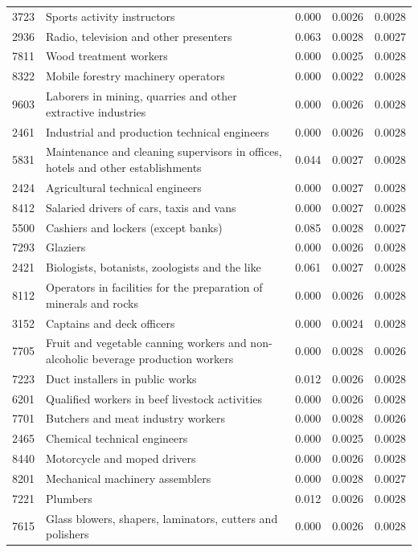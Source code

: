 \begin{longtable}{p{}>{\raggedright\arraybackslash}p{}rrr}
3723 & Sports activity instructors & 0.000 & 0.0026 & 0.0028 \\
2936 & Radio, television and other presenters & 0.063 & 0.0028 & 0.0027 \\
7811 & Wood treatment workers & 0.000 & 0.0025 & 0.0028 \\
8322 & Mobile forestry machinery operators & 0.000 & 0.0022 & 0.0028 \\
9603 & Laborers in mining, quarries and other extractive industries & 0.000 & 0.0026 & 0.0028 \\
2461 & Industrial and production technical engineers & 0.000 & 0.0026 & 0.0028 \\
5831 & Maintenance and cleaning supervisors in offices, hotels and other establishments & 0.044 & 0.0027 & 0.0028 \\
2424 & Agricultural technical engineers & 0.000 & 0.0027 & 0.0028 \\
8412 & Salaried drivers of cars, taxis and vans & 0.000 & 0.0027 & 0.0028 \\
5500 & Cashiers and lockers (except banks) & 0.085 & 0.0028 & 0.0027 \\
7293 & Glaziers & 0.000 & 0.0026 & 0.0028 \\
2421 & Biologists, botanists, zoologists and the like & 0.061 & 0.0027 & 0.0028 \\
8112 & Operators in facilities for the preparation of minerals and rocks & 0.000 & 0.0026 & 0.0028 \\
3152 & Captains and deck officers & 0.000 & 0.0024 & 0.0028 \\
7705 & Fruit and vegetable canning workers and non-alcoholic beverage production workers & 0.000 & 0.0028 & 0.0026 \\
7223 & Duct installers in public works & 0.012 & 0.0026 & 0.0028 \\
6201 & Qualified workers in beef livestock activities & 0.000 & 0.0026 & 0.0028 \\
7701 & Butchers and meat industry workers & 0.000 & 0.0028 & 0.0026 \\
2465 & Chemical technical engineers & 0.000 & 0.0025 & 0.0028 \\
8440 & Motorcycle and moped drivers & 0.000 & 0.0026 & 0.0028 \\
8201 & Mechanical machinery assemblers & 0.000 & 0.0028 & 0.0027 \\
7221 & Plumbers & 0.012 & 0.0026 & 0.0028 \\
7615 & Glass blowers, shapers, laminators, cutters and polishers & 0.000 & 0.0026 & 0.0028 \\

\end{longtable}
